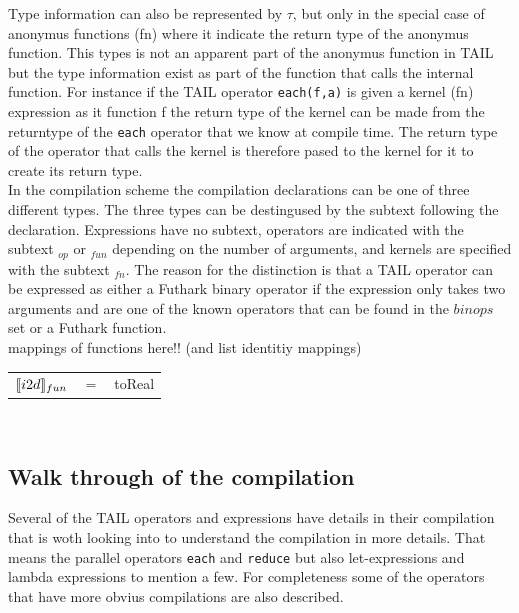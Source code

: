 \documentclass[11pt]{article}
\begin{document}
Type information can also be represented by $\tau$, but only in the special case of anonymus functions (fn) where it 
indicate the return type of the anonymus function. This types is not an apparent part of the anonymus function in TAIL
but the type information exist as part of the function that calls the internal function. For instance if the TAIL operator {\tt each(f,a)} is given a kernel (fn) expression as it function f the return type of the kernel can be made from the returntype of the {\tt each} operator that we know at compile time. The return type of the operator that calls the kernel is therefore pased to the kernel for it to create its return type. \\

In the compilation scheme the compilation declarations can be one of three different types. The three types can be destingused by the subtext following the declaration.  Expressions have no subtext, operators are indicated with the subtext $_{op}$ or $_{fun}$ depending on the number of arguments, and kernels are specified with the subtext $_{fn}$. The reason for the distinction is that a TAIL operator can be expressed as either a Futhark binary operator if the expression only takes two arguments and are one of the known operators that can be found in the $binops$ set or a Futhark function. \\



mappings of functions here!! (and list identitiy mappings)\\
\begin{tabular}{l c l}
$\llbracket i2d \rrbracket_{fun}$ & $=$ & toReal\\ 
\end{tabular}\\

\subsection{Walk through of the compilation}

%

Several of the TAIL operators and expressions have details in their compilation that is woth looking into to understand the compilation in more details. That means the parallel operators {\tt each} and {\tt reduce} but also let-expressions and lambda expressions to mention a few. For completeness some of the operators that have more obvius compilations are also described. 
\end{document}
